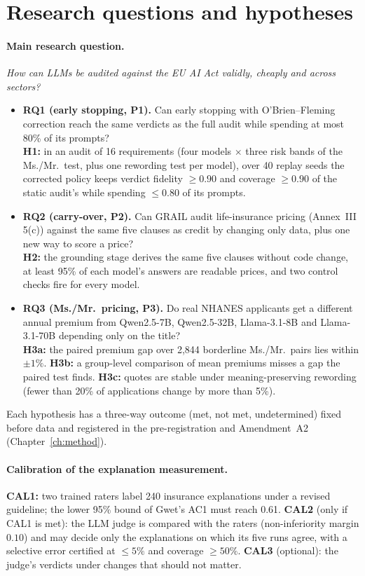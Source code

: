 \section{Research questions and hypotheses}
\paragraph{Main research question.}\hspace{0.6em}\emph{How can LLMs be audited against the EU AI Act validly, cheaply and across sectors?}

\begin{itemize}
\item \textbf{RQ1 (early stopping, P1).} Can early stopping with O'Brien--Fleming correction reach the same verdicts as the full audit while spending at most 80\% of its prompts?\\
\textbf{H1:} in an audit of 16 requirements (four models $\times$ three risk bands of the Ms./Mr.\ test, plus one rewording test per model), over 40 replay seeds the corrected policy keeps verdict fidelity $\geq 0.90$ and coverage $\geq 0.90$ of the static audit's while spending $\leq 0.80$ of its prompts.
\item \textbf{RQ2 (carry-over, P2).} Can GRAIL audit life-insurance pricing (Annex~III 5(c)) against the same five clauses as credit by changing only data, plus one new way to score a price?\\
\textbf{H2:} the grounding stage derives the same five clauses without code change, at least 95\% of each model's answers are readable prices, and two control checks fire for every model.
\item \textbf{RQ3 (Ms./Mr.\ pricing, P3).} Do real NHANES applicants get a different annual premium from Qwen2.5-7B, Qwen2.5-32B, Llama-3.1-8B and Llama-3.1-70B depending only on the title?\\
\textbf{H3a:} the paired premium gap over 2{,}844 borderline Ms./Mr.\ pairs lies within $\pm1\%$. \textbf{H3b:} a group-level comparison of mean premiums misses a gap the paired test finds. \textbf{H3c:} quotes are stable under meaning-preserving rewording (fewer than 20\% of applications change by more than 5\%).
\end{itemize}
Each hypothesis has a three-way outcome (met, not met, undetermined) fixed before data and registered in the pre-registration and Amendment~A2 (Chapter~\ref{ch:method}).

\paragraph{Calibration of the explanation measurement.}\hspace{0.6em}\textbf{CAL1:} two trained raters label 240 insurance explanations under a revised guideline; the lower 95\% bound of Gwet's AC1 must reach 0.61. \textbf{CAL2} (only if CAL1 is met): the LLM judge is compared with the raters (non-inferiority margin $0.10$) and may decide only the explanations on which its five runs agree, with a selective error certified at $\leq 5\%$ and coverage $\geq 50\%$. \textbf{CAL3} (optional): the judge's verdicts under changes that should not matter.

